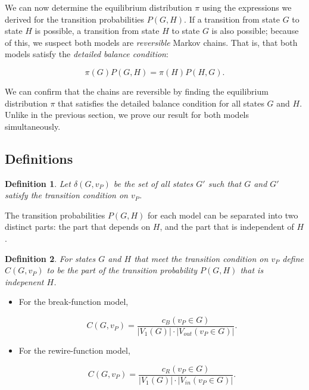\documentclass[a4paper,10pt]{article}
\newtheorem{defn}{Definition}
\begin{document}
We can now determine the equilibrium distribution $\pi$ using the expressions we derived for the transition probabilities $P(G, H)$. If a transition from state $G$ to state $H$ is possible, a transition from state $H$ to state $G$ is also possible; because of this, we suspect both models are \emph{reversible} Markov chains. That is, that both models satisfy the \emph{detailed balance condition}:

\begin{equation}
 \pi(G) P(G, H) = \pi(H) P(H, G).
\end{equation}

We can confirm that the chains are reversible by finding the equilibrium distribution $\pi$ that satisfies the detailed balance condition for all states $G$ and $H$. Unlike in the previous section, we prove our result for both models simultaneously.

\subsection{Definitions}

\begin{defn}
Let $\delta(G, v_P)$ be the set of all states $G'$ such that $G$ and $G'$ satisfy the transition condition on $v_P$.
\end{defn}

The transition probabilities $P(G, H)$ for each model can be separated into two distinct parts: the part that depends on $H$, and the part that is independent of $H$.

\begin{defn} 
For states $G$ and $H$ that meet the transition condition on $v_P$ define $C(G, v_P)$ to be the part of the transition probability $P(G, H)$ that is indepenent $H$.
\end{defn}

\begin{itemize}
 \item For the break-function model,

\begin{equation}
 C(G, v_P) = \frac{c_B(v_P \in G)}{|V_1(G)| \cdot |V_{out}(v_P \in G)|}.
\end{equation}

 \item For the rewire-function model,

\begin{equation}
 C(G, v_P) = \frac{c_R(v_P \in G)}{|V_1(G)| \cdot |V_{in}(v_P \in G)|}.
\end{equation}

\end{itemize}
\end{document}
